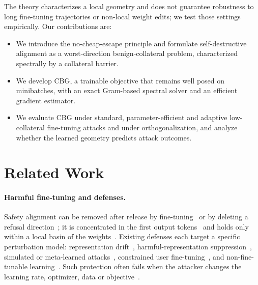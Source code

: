 \documentclass[11pt]{article}
\begin{document}
The theory characterizes a local geometry and does not guarantee robustness to long fine-tuning trajectories or non-local weight edits; we test those settings empirically. Our contributions are:
\begin{itemize}[leftmargin=*]
\item We introduce the no-cheap-escape principle and formulate self-destructive alignment as a worst-direction benign-collateral problem, characterized spectrally by a collateral barrier.
\item We develop CBG, a trainable objective that remains well posed on minibatches, with an exact Gram-based spectral solver and an efficient gradient estimator.
\item We evaluate CBG under standard, parameter-efficient and adaptive low-collateral fine-tuning attacks and under orthogonalization, and analyze whether the learned geometry predicts attack outcomes.
\end{itemize}





\section{Related Work}
\label{sec:related}

\paragraph{Harmful fine-tuning and defenses.}
Safety alignment can be removed after release by fine-tuning~\citep{qi2024finetuning} or by deleting a refusal direction~\citep{arditi2024refusal}; it is concentrated in the first output tokens~\citep{qi2025safety} and holds only within a local basin of the weights~\citep{peng2024navigating}. Existing defenses each target a specific perturbation model: representation drift~\citep{huang2024vaccine,liu2024targeted}, harmful-representation suppression~\citep{rosati2024repnoise}, simulated or meta-learned attacks~\citep{huang2025booster,tamirisa2025tar}, constrained user fine-tuning~\citep{huang2024lisa,li2025salora}, and non-fine-tunable learning~\citep{deng2024sophon}. Such protection often fails when the attacker changes the learning rate, optimizer, data or objective~\citep{qi2025evaluating,zloczower2026one}.
\end{document}
